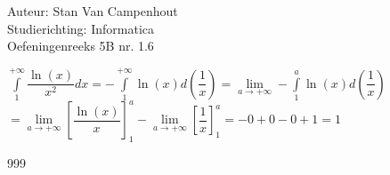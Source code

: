 \documentclass[a4paper]{article}
\begin{document}
  
\noindent \large Auteur: Stan Van Campenhout \\
\noindent \large Studierichting:  Informatica\\
\noindent \large Oefeningenreeks 5B nr. 1.6\\

\medskip

\normalsize

$ \displaystyle\int\limits_1^{+\infty}\dfrac{\ln(x)}{x^2} dx = -\displaystyle\int\limits_1^{+\infty}\ln(x)d\left(\dfrac{1}{x}\right)
= \lim\limits_{a\rightarrow+\infty}-\displaystyle\int\limits_1^a\ln(x)d\left(\dfrac{1}{x}\right) $\\

$ = \lim\limits_{a\rightarrow+\infty}\left[\dfrac{\ln(x)}{x}\right]_1^a - \lim\limits_{a\rightarrow+\infty}\left[\dfrac{1}{x}\right]_1^a = -0 + 0 - 0 +1 = 1 $\\


\begin{thebibliography}{999}
\end{thebibliography}
\end{document}
